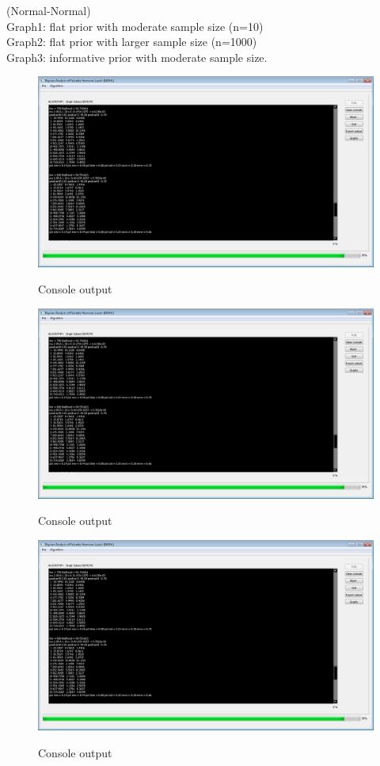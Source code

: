 \documentclass[11pt]{book}
\begin{document}
(Normal-Normal)\\
Graph1: flat prior with moderate sample size (n=10)\\
Graph2: flat prior with larger sample size (n=1000)\\
Graph3: informative prior with moderate sample size.
\begin{figure}
  \centering
  \includegraphics[width=\textwidth]{consoleoutput.PNG}\\
  \caption{Console output}\label{consoleoutput}
\end{figure}
\begin{figure}
  \centering
  \includegraphics[width=\textwidth]{consoleoutput.PNG}\\
  \caption{Console output}\label{consoleoutput}
\end{figure}
\begin{figure}
  \centering
  \includegraphics[width=\textwidth]{consoleoutput.PNG}\\
  \caption{Console output}\label{consoleoutput}
\end{figure}
\end{document}
